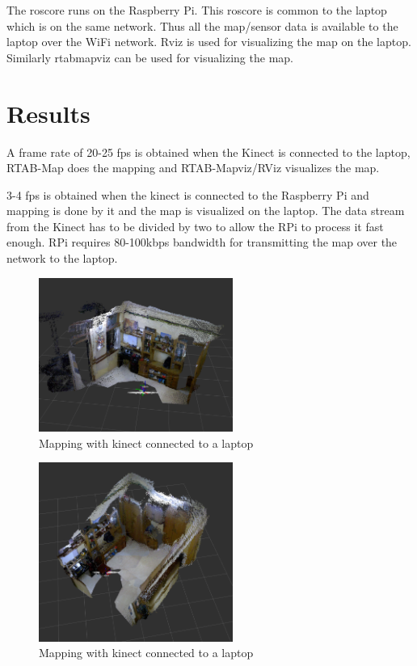 \documentclass[journal]{IEEEtran}
\begin{document}
The roscore runs on the Raspberry Pi. This roscore is common to the laptop which is on the same network. Thus all the map/sensor data is available to the laptop over the WiFi network.
Rviz is used for visualizing the map on the laptop. Similarly rtabmapviz can be used for visualizing the map.


\section{Results}
A frame rate of 20-25 fps is obtained when the Kinect is connected to the laptop, RTAB-Map does the mapping and RTAB-Mapviz/RViz visualizes the map. 

3-4 fps is obtained when the kinect is connected to the Raspberry Pi and mapping is done by it and the map is visualized on the laptop. The data stream from the Kinect has to be divided by two to allow the RPi to process it fast enough. RPi requires 80-100kbps bandwidth for transmitting the map over the network to the laptop.



\begin{figure}[ht]
\centering
\includegraphics[width=2.5in]{1(1).png}
\caption{Mapping with kinect connected to a laptop}
\label{fig_sim}
\end{figure}
 
\begin{figure}[ht]
	\centering
	\includegraphics[width=2.5in]{1(2).png}
	\caption{Mapping with kinect connected to a laptop}
	\label{fig_sim}
\end{figure}
\end{document}
